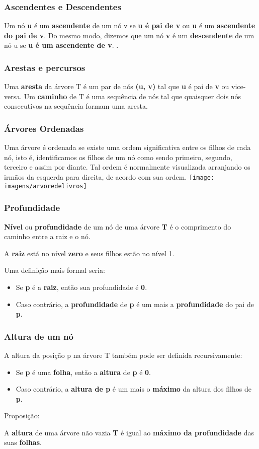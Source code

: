 \documentclass{beamer}
\begin{document}
\begin{frame}
\frametitle{Ascendentes e Descendentes}
Um nó \textbf{u} é um \textbf{ascendente} de um nó v se \textbf{u é pai de v} ou \textbf{u} é um \textbf{ascendente do pai de v}. Do mesmo modo, dizemos que um nó \textbf{v} é um \textbf{descendente} de um nó u se \textbf{u é um ascendente de v}.
.
\end{frame}

\begin{frame}
\frametitle{Arestas e percursos}
Uma \textbf{aresta} da árvore T é um par de nós \textbf{(u, v)} tal que \textbf{u} é pai de \textbf{v} ou vice-versa. Um \textbf{caminho} de T é uma sequência de nós tal que quaisquer dois nós consecutivos na sequência formam uma aresta.
\end{frame}

\begin{frame}
\frametitle{Árvores Ordenadas}
Uma árvore é ordenada se existe uma ordem significativa entre os filhos de cada nó, isto é, identificamos os filhos de um nó como sendo primeiro, segundo, terceiro e assim por diante. Tal ordem é normalmente visualizada arranjando os irmãos da esquerda para direita, de acordo com sua ordem.
\texttt{[image: imagens/arvoredelivros]}
\end{frame}







\begin{frame}
\frametitle{Profundidade}
\textbf{Nível} ou \textbf{profundidade} de um nó de uma árvore \textbf{T} é o comprimento do caminho entre a raiz e o nó.

A \textbf{raiz} está no nível \textbf{zero} e seus filhos estão no nível 1.

Uma definição mais formal seria:
\begin{itemize}
\item Se \textbf{p} é a \textbf{raiz}, então sua profundidade é \textbf{0}.
\item Caso contrário, a \textbf{profundidade} de \textbf{p} é um mais a \textbf{profundidade} do pai de \textbf{p}.
\end{itemize}
\end{frame}

\begin{frame}
\frametitle{Altura de um nó}

A altura da posição p na árvore T também pode ser definida recursivamente:
\begin{itemize}
\item Se \textbf{p} é uma \textbf{folha}, então a \textbf{altura} de \textbf{p} é \textbf{0}.
\item Caso contrário, a \textbf{altura de p} é um mais o \textbf{máximo} da altura dos filhos de \textbf{p}.
\end{itemize}

Proposição:

A \textbf{altura} de uma árvore não vazia \textbf{T} é igual ao \textbf{máximo da profundidade} das suas \textbf{folhas}.
\end{frame}
\end{document}
